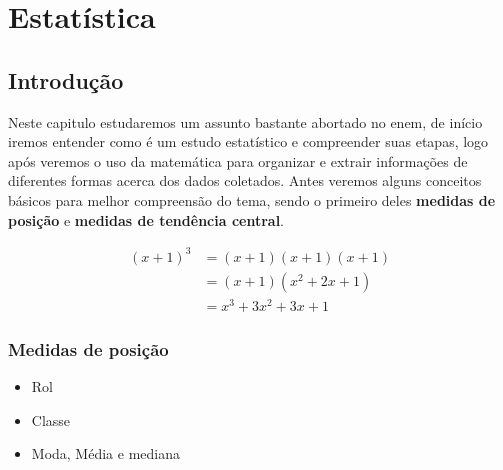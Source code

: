 \chapter{Estatística}
\section{Introdução}
Neste capitulo estudaremos um assunto bastante abortado no enem, de início iremos entender como é um estudo estatístico e compreender suas etapas, logo após veremos o uso da matemática para organizar e extrair informações de diferentes formas acerca dos dados coletados. Antes veremos alguns conceitos básicos para melhor compreensão do tema, sendo o primeiro deles \textbf{medidas de posição} e \textbf{medidas de tendência central}.

\begin{align*}
(x+1)^3 &= (x+1)(x+1)(x+1) \\
&= (x+1)(x^2 + 2x + 1) \\
&= x^3 + 3x^2 + 3x + 1
\end{align*}

\subsection{Medidas de posição}
\begin{definition}
	
\end{definition}
	\begin{itemize}
		\item Rol
		\item Classe
		\item Moda, Média e mediana 
	\end{itemize}